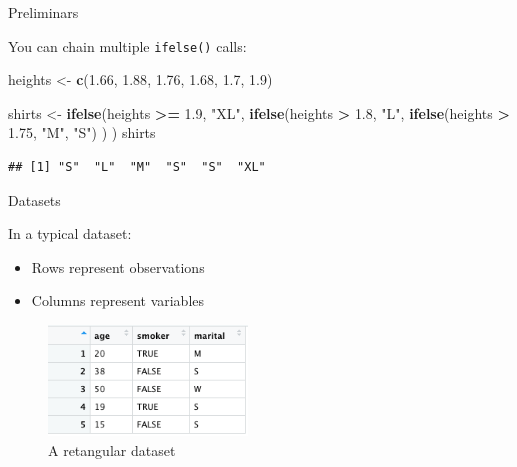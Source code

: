 \documentclass[ignorenonframetext,]{beamer}
\newenvironment{Shaded}{\begin{snugshade}}{\end{snugshade}}
\newcommand{\FloatTok}[1]{\textcolor[rgb]{0.00,0.00,0.81}{#1}}
\newcommand{\KeywordTok}[1]{\textcolor[rgb]{0.13,0.29,0.53}{\textbf{#1}}}
\newcommand{\NormalTok}[1]{#1}
\newcommand{\OperatorTok}[1]{\textcolor[rgb]{0.81,0.36,0.00}{\textbf{#1}}}
\newcommand{\StringTok}[1]{\textcolor[rgb]{0.31,0.60,0.02}{#1}}
\providecommand{\tightlist}{%
  \setlength{\itemsep}{0pt}\setlength{\parskip}{0pt}}
\begin{document}
\begin{frame}[fragile]{Preliminars}
\protect\hypertarget{preliminars-2}{}

You can chain multiple \texttt{ifelse()} calls:

\begin{Shaded}
\begin{Highlighting}[]
\NormalTok{heights <-}\StringTok{ }\KeywordTok{c}\NormalTok{(}\FloatTok{1.66}\NormalTok{, }\FloatTok{1.88}\NormalTok{, }\FloatTok{1.76}\NormalTok{, }\FloatTok{1.68}\NormalTok{, }\FloatTok{1.7}\NormalTok{, }\FloatTok{1.9}\NormalTok{)}

\NormalTok{shirts <-}\StringTok{ }\KeywordTok{ifelse}\NormalTok{(heights }\OperatorTok{>=}\StringTok{ }\FloatTok{1.9}\NormalTok{, }\StringTok{"XL"}\NormalTok{,}
                 \KeywordTok{ifelse}\NormalTok{(heights }\OperatorTok{>}\StringTok{ }\FloatTok{1.8}\NormalTok{, }\StringTok{"L"}\NormalTok{,}
                        \KeywordTok{ifelse}\NormalTok{(heights }\OperatorTok{>}\StringTok{ }\FloatTok{1.75}\NormalTok{, }\StringTok{"M"}\NormalTok{,}
                               \StringTok{"S"}\NormalTok{)}
\NormalTok{                        )}
\NormalTok{                 )}
\NormalTok{shirts}
\end{Highlighting}
\end{Shaded}

\begin{verbatim}
## [1] "S"  "L"  "M"  "S"  "S"  "XL"
\end{verbatim}

\end{frame}

\begin{frame}{Datasets}
\protect\hypertarget{datasets}{}

In a typical dataset:

\begin{itemize}
\tightlist
\item
  Rows represent observations
\item
  Columns represent variables
\end{itemize}

\begin{figure}
\centering
\includegraphics[width=2.08333in,height=\textheight]{figures/dataset}
\caption{A retangular dataset}
\end{figure}

\end{frame}
\end{document}
